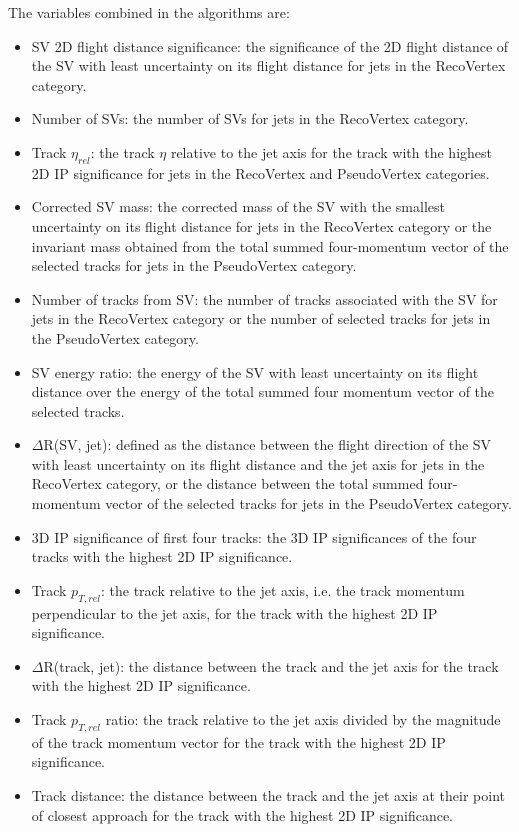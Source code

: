 The variables combined in the algorithms are: 
\begin{itemize}
\item SV 2D flight distance significance: the significance of the 2D flight distance of the SV with least uncertainty on its flight distance for jets in the RecoVertex category.
\item Number of SVs: the number of SVs for jets in the RecoVertex category.
\item Track $\eta_{rel}$: the track $\eta$ relative to the jet axis for the track with the highest 2D IP significance for jets in the RecoVertex and PseudoVertex categories.
\item Corrected SV mass: the corrected mass of the SV with the smallest uncertainty on its flight distance for jets in the RecoVertex category or the invariant mass obtained from the total summed four-momentum vector of the selected tracks for jets in the PseudoVertex category.
\item Number of tracks from SV: the number of tracks associated with the SV for jets in the RecoVertex category or the number of selected tracks for jets in the PseudoVertex category.
\item SV energy ratio: the energy of the SV with least uncertainty on its flight distance over the energy of the total summed four momentum vector of the selected tracks.
\item $\Delta$R(SV, jet): defined as the distance between the flight direction of the SV with least uncertainty on its flight distance and the jet axis for jets in the RecoVertex category, or the distance between the total summed four-momentum vector of the selected tracks for jets in the PseudoVertex category.
\item 3D IP significance of first four tracks: the 3D IP significances of the four tracks with the highest 2D IP significance.
\item Track $p_{T,rel}$: the track \pt relative to the jet axis, i.e. the track momentum perpendicular to the jet axis, for the track with the highest 2D IP significance.
\item $\Delta$R(track, jet): the distance between the track and the jet axis for the track with the highest 2D IP significance.
\item Track $p_{T,rel}$ ratio: the track \pt relative to the jet axis divided by the magnitude of the track momentum vector for the track with the highest 2D IP significance.
\item Track distance: the distance between the track and the jet axis at their point of closest approach for the track with the highest 2D IP significance.

\end{itemize}
